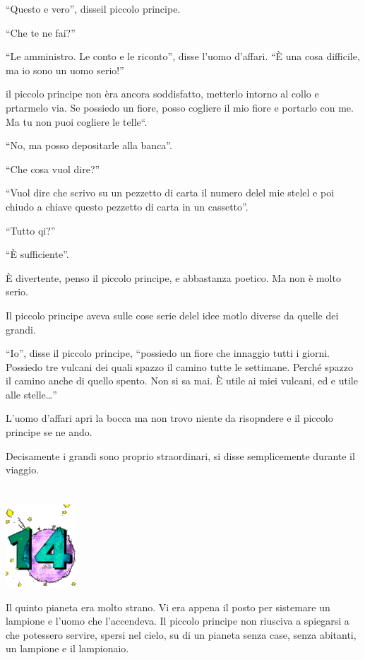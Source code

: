 \documentclass[11pt]{scrbook}
\begin{document}
``Questo e vero'', disseil piccolo principe.

``Che te ne fai?''

``Le amministro. Le conto e le riconto'', disse l'uomo d'affari. ``È una
cosa difficile, ma io sono un uomo serio!''

il piccolo principe non èra ancora soddisfatto, metterlo intorno al
collo e prtarmelo via. Se possiedo un fiore, posso cogliere il mio fiore
e portarlo con me. Ma tu non puoi cogliere le telle``.

``No, ma posso depositarle alla banca''.

``Che cosa vuol dire?''

``Vuol dire che scrivo su un pezzetto di carta il numero delel mie
stelel e poi chiudo a chiave questo pezzetto di carta in un cassetto''.

``Tutto qi?''

``È sufficiente''.

È divertente, penso il piccolo principe, e abbastanza poetico. Ma non è
molto serio.

Il piccolo principe aveva sulle cose serie delel idee motlo diverse da
quelle dei grandi.

``Io'', disse il piccolo principe, ``possiedo un fiore che innaggio
tutti i giorni. Possiedo tre vulcani dei quali spazzo il camino tutte le
settimane. Perché spazzo il camino anche di quello spento. Non si sa
mai. È utile ai miei vulcani, ed e utile alle stelle\ldots{}''

L'uomo d'affari apri la bocca ma non trovo niente da risopndere e il
piccolo principe se ne ando.

Decisamente i grandi sono proprio straordinari, si disse semplicemente
durante il viaggio.

\chapter{}
\begin{center}
\includegraphics{img/chapter14}
\end{center}

Il quinto pianeta era molto strano. Vi era appena il posto per sistemare
un lampione e l'uomo che l'accendeva. Il piccolo principe non riusciva a
spiegarsi a che potessero servire, spersi nel cielo, su di un pianeta
senza case, senza abitanti, un lampione e il lampionaio.
\end{document}
